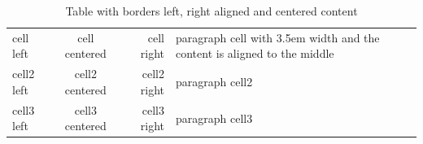     \begin{table}[h]
        \centering  %
        \begin{tabular}{|| l | c | r | m{4.2em} ||}
            \hline  %
            cell left & cell centered & cell right & paragraph cell with 3.5em width and the content is aligned to the middle \\
            \cline{3-4}
            cell2 left & cell2 centered & cell2 right & paragraph cell2 \\
            \hline
            \hline
            cell3 left & cell3 centered & cell3 right & paragraph cell3 \\
            \hline 
        \end{tabular}
        \caption{Table with borders left, right aligned and centered content}
        \label{table:intermediate_table}
    \end{table}



%           
%           
%           
%           
%           
%           
% 
%
%
% 
%
%
% 
%
%
% 
%
%
% 
%
%
% 
%
%
% 
